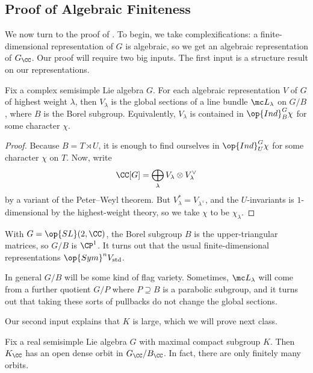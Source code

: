 \documentclass[../notes.tex]{subfiles}
\begin{document}
\subsection{Proof of Algebraic Finiteness}
We now turn to the proof of . To begin, we take complexifications: a finite-dimensional representation of $G$ is algebraic, so we get an algebraic representation of $G_\CC$. Our proof will require two big inputs. The first input is a structure result on our representations.
\begin{theorem}
	Fix a complex semisimple Lie algebra $G$. For each algebraic representation $V$ of $G$ of highest weight $\lambda$, then $V_\lambda$ is the global sections of a line bundle $\mc L_\lambda$ on $G/B$, where $B$ is the Borel subgroup. Equivalently, $V_\lambda$ is contained in $\op{Ind}_B^G\chi$ for some character $\chi$.
\end{theorem}
\begin{proof}
	Because $B=T\rtimes U$, it is enough to find ourselves in $\op{Ind}_U^G\chi$ for some character $\chi$ on $T$. Now, write
	\[\CC[G]=\bigoplus_\lambda V_\lambda\otimes V_\lambda^\lor\]
	by a variant of the Peter--Weyl theorem. But $V_\lambda^*=V_{\lambda^\lor}$, and the $U$-invariants is $1$-dimensional by the highest-weight theory, so we take $\chi$ to be $\chi_\lambda$.
\end{proof}
\begin{example}
	With $G=\op{SL}(2,\CC)$, the Borel subgroup $B$ is the upper-triangular matrices, so $G/B$ is $\CP^1$. It turns out that the usual finite-dimensional representations $\op{Sym}^nV_{\mathrm{std}}$.
\end{example}
\begin{remark}
	In general $G/B$ will be some kind of flag variety. Sometimes, $\mc L_\lambda$ will come from a further quotient $G/P$ where $P\supseteq B$ is a parabolic subgroup, and it turns out that taking these sorts of pullbacks do not change the global sections.
\end{remark}
Our second input explains that $K$ is large, which we will prove next class.
\begin{proposition} \label{prop:almost-iwasawa-decomp}
	Fix a real semisimple Lie algebra $G$ with maximal compact subgroup $K$. Then $K_\CC$ has an open dense orbit in $G_\CC/B_\CC$. In fact, there are only finitely many orbits.
\end{proposition}
\end{document}
